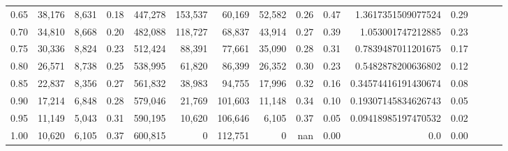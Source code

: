 \begin{tabular}{rrrrrrrrrrrrrrr}
0.65 &  38,176 &  8,631 &  0.18 &  447,278 &  153,537 &   60,169 &   52,582 &  0.26 &  0.47 &   1.3617351509077524 &      0.29 \\
0.70 &  34,810 &  8,668 &  0.20 &  482,088 &  118,727 &   68,837 &   43,914 &  0.27 &  0.39 &    1.053001747212885 &      0.23 \\
0.75 &  30,336 &  8,824 &  0.23 &  512,424 &   88,391 &   77,661 &   35,090 &  0.28 &  0.31 &   0.7839487011201675 &      0.17 \\
0.80 &  26,571 &  8,738 &  0.25 &  538,995 &   61,820 &   86,399 &   26,352 &  0.30 &  0.23 &   0.5482878200636802 &      0.12 \\
0.85 &  22,837 &  8,356 &  0.27 &  561,832 &   38,983 &   94,755 &   17,996 &  0.32 &  0.16 &  0.34574416191430674 &      0.08 \\
0.90 &  17,214 &  6,848 &  0.28 &  579,046 &   21,769 &  101,603 &   11,148 &  0.34 &  0.10 &  0.19307145834626743 &      0.05 \\
0.95 &  11,149 &  5,043 &  0.31 &  590,195 &   10,620 &  106,646 &    6,105 &  0.37 &  0.05 &  0.09418985197470532 &      0.02 \\
1.00 &  10,620 &  6,105 &  0.37 &  600,815 &        0 &  112,751 &        0 &   nan &  0.00 &                  0.0 &      0.00 \\
\bottomrule
\end{tabular}
